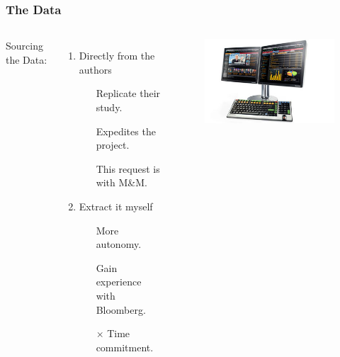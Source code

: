 \documentclass{beamer}
\begin{document}
\begin{frame}[t]
\frametitle{The Data}
\begin{columns}
Sourcing the Data: \\
\begin{enumerate}
\item Directly from the authors
	\begin{itemize}
	\item[\checkmark]{Replicate their study.}	
	\item[\checkmark]{Expedites the project.}
	\item [] This request is with M\&M. 
	\end{itemize}
\vspace{1cm}	
\item Extract it myself
	\begin{itemize}
	\item[\checkmark]{More autonomy.}	
	\item[\checkmark]{Gain experience with Bloomberg.}
	\item[$\times$]{Time commitment.}
	\end{itemize}
\end{enumerate}

\begin{figure}[h]
\centering
\includegraphics[scale=0.4]{images/Bloomberg-Terminal.jpg}
\end{figure}
\end{columns}





\end{frame}

\end{document}
